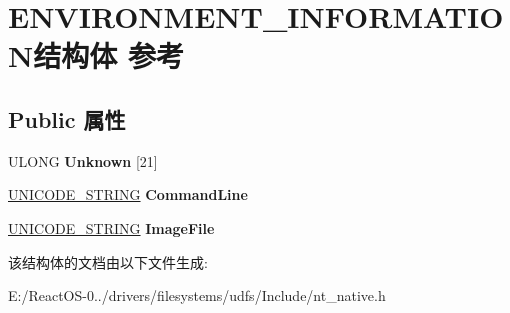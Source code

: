 \hypertarget{struct_e_n_v_i_r_o_n_m_e_n_t___i_n_f_o_r_m_a_t_i_o_n}{}\section{E\+N\+V\+I\+R\+O\+N\+M\+E\+N\+T\+\_\+\+I\+N\+F\+O\+R\+M\+A\+T\+I\+O\+N结构体 参考}
\label{struct_e_n_v_i_r_o_n_m_e_n_t___i_n_f_o_r_m_a_t_i_o_n}
\subsection*{Public 属性}
\begin{DoxyCompactItemize}
\item 
\mbox{\label{struct_e_n_v_i_r_o_n_m_e_n_t___i_n_f_o_r_m_a_t_i_o_n_a3095922be141a42da4e16ed2d9d50ad2}} 
U\+L\+O\+NG {\bfseries Unknown} \mbox{[}21\mbox{]}
\item 
\mbox{\label{struct_e_n_v_i_r_o_n_m_e_n_t___i_n_f_o_r_m_a_t_i_o_n_a2cd36272d66a4cf375f6de15d5bc2e3b}} 
\hyperlink{struct___u_n_i_c_o_d_e___s_t_r_i_n_g}{U\+N\+I\+C\+O\+D\+E\+\_\+\+S\+T\+R\+I\+NG} {\bfseries Command\+Line}
\item 
\mbox{\label{struct_e_n_v_i_r_o_n_m_e_n_t___i_n_f_o_r_m_a_t_i_o_n_acfd988fa29572747e27f2d7f756b5bcf}} 
\hyperlink{struct___u_n_i_c_o_d_e___s_t_r_i_n_g}{U\+N\+I\+C\+O\+D\+E\+\_\+\+S\+T\+R\+I\+NG} {\bfseries Image\+File}
\end{DoxyCompactItemize}


该结构体的文档由以下文件生成\+:\begin{DoxyCompactItemize}
\item 
E\+:/\+React\+O\+S-\/0../drivers/filesystems/udfs/\+Include/nt\+\_\+native.\+h\end{DoxyCompactItemize}
